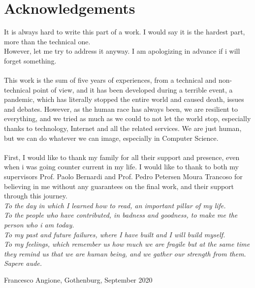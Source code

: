 \section*{Acknowledgements}
 It is always hard to write this part of a work. I would say it is the hardest part, more than the technical one.\\
However, let me try to address it anyway. I am apologizing in advance if i will forget something.\\\\

This work is the sum of five years of experiences, from a technical and non-technical point of view, and it has been developed during a terrible event, a pandemic, which has literally stopped the entire world and caused death, issues and debates. However, as the human race has always been, we are resilient to everything, and we tried as much as we could to not let the world stop, especially thanks to technology, Internet and all the related services.
We are just human, but we can do whatever we can image, especially in Computer Science.\\\\

First, I would like to thank my family for all their support and presence, even when i was going counter current in my life.
I would like to thank to both my supervisors Prof. Paolo Bernardi and Prof. Pedro Petersen Moura Trancoso for believing in me without any guarantees on the final work, and their support through this journey.\\

\textit{To the day in which I learned how to read, an important pillar of my life.\\
To the people who have contributed, in badness and goodness, to make me the person who i am today.\\
To my past and future failures, where I have built and I will build myself.\\
To my feelings, which remember us how much we are fragile but at the same time they remind us that we are human being, and we gather our strength from them.\\
Sapere aude.\\}

\vspace{1.5cm}
\hfill
Francesco Angione, Gothenburg, September 2020

\newpage				%
\thispagestyle{empty}
\mbox{}